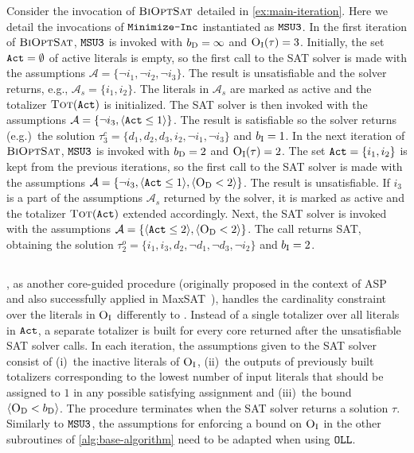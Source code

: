 \begin{example}\label{ex:msu}
  Consider the invocation of $\textsc{BiOptSat}$ detailed in \cref{ex:main-iteration}. 
  Here we detail the invocations of $\texttt{Minimize-\allowbreak{}Inc}$ instantiated as $\texttt{MSU3}$. 
  In the first iteration of $\textsc{BiOptSat}$, $\texttt{MSU3}$ is invoked with $b_{\text{D}} =\infty$ and $\textsc{O}_{\text{I}}(\tau) = 3$.
  Initially, the set $\texttt{Act} = \emptyset$ of active literals is empty, so the first call to the SAT solver is made with the assumptions $\mathcal{A} =  \{ \lnot i_1, \lnot i_2, \lnot i_3\}$.
  The result is unsatisfiable and the solver returns, e.g., $\mathcal{A}_s = \{i_1, i_2\}$. 
  The literals in $\mathcal{A}_s$ are marked as active and the totalizer $\textsc{Tot}(\texttt{Act})$ is initialized.
  The SAT solver is then invoked with the assumptions $\mathcal{A} = \{ \lnot i_3, \langle \texttt{Act} \leq 1 \rangle\}$. 
  The result is satisfiable so the solver returns (e.g.)\ the solution $\tau^c_3 = \{ d_1,  d_2, d_3, i_2, \lnot i_1, \lnot i_3\}$ and $b_{\text{I}} = 1$.
  In the next iteration of $\textsc{BiOptSat}$, $\texttt{MSU3}$ is invoked with $b_{\text{D}} = 2$ and $\textsc{O}_{\text{I}}(\tau) = 2$.
  The set $\texttt{Act} = \{i_1, i_2\}$ is kept from the previous iterations, so the first call to the SAT solver is made with the assumptions  $\mathcal{A} = \{ \lnot i_3, \langle \texttt{Act} \leq 1 \rangle,  \langle \textsc{O}_{\text{D}} < 2 \rangle \}$.
  The result is unsatisfiable. If $i_3$  is a part of the assumptions $\mathcal{A}_s$ returned by the solver, it is marked as active and the totalizer $\textsc{Tot}(\texttt{Act})$ extended accordingly. 
  Next, the SAT solver is invoked with the assumptions $\mathcal{A} = \{\langle \texttt{Act} \leq 2 \rangle,  \langle \textsc{O}_{\text{D}} < 2 \rangle \}$. The call returns SAT, obtaining the solution $\tau^o_2 = \{ i_1, i_3, d_2, \lnot d_1, \lnot d_3, \lnot i_2\}$ and $b_{\text{I}} = 2$.
\end{example}

\subsection{\oll{}\label{sec:oll}}

\oll{}, as another core-guided procedure (originally proposed in the context of ASP~\autocite{DBLP:conf/iclp/AndresKMS12} and also successfully applied in MaxSAT~\autocite{DBLP:conf/cp/MorgadoDM14,DBLP:journals/jsat/IgnatievMM19}), handles the cardinality constraint over the literals in $\textsc{O}_{\text{I}}$ differently to \msu{}.
Instead of a single totalizer over all literals in $\texttt{Act}$, a separate totalizer is built for every core returned after the unsatisfiable SAT solver calls.
In each iteration, the assumptions given to the SAT solver consist of (i)~the inactive literals of $\textsc{O}_{\text{I}}$, (ii)~the outputs of previously built totalizers corresponding to the lowest number of input literals that should be assigned to $1$ in any possible satisfying assignment and (iii)~the bound $\langle \textsc{O}_{\text{D}} < b_{\text{D}} \rangle$.
The procedure terminates when the SAT solver returns a solution $\tau$.
Similarly to $\texttt{MSU3}$, the assumptions for enforcing a bound on $\textsc{O}_{\text{I}}$ in the other subroutines of \cref{alg:base-algorithm} need to be adapted when using $\texttt{OLL}$.

